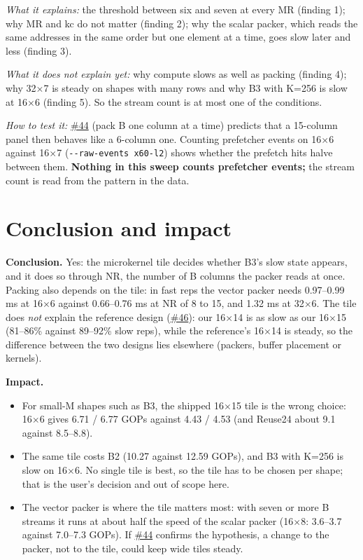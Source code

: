 \documentclass[10pt,a4paper]{article}
\newcommand{\iss}[1]{\href{https://github.com/JieGH/RVV_code_gen_via_MLIR_xDSL/issues/#1}{\##1}}
\begin{document}
\emph{What it explains:} the threshold between six and seven at every MR (finding 1); why MR and kc do not matter
(finding 2); why the scalar packer, which reads the same addresses in the same order but one element at a time, goes
slow later and less (finding 3).

\emph{What it does not explain yet:} why compute slows as well as packing (finding 4); why 32$\times$7 is steady on shapes with
many rows and why B3 with K=256 is slow at 16$\times$6 (finding 5). So the stream count is at most one of the conditions.

\emph{How to test it:} \iss{44} (pack B one column at a time) predicts that a 15-column panel then behaves like a
6-column one. Counting prefetcher events on 16$\times$6 against 16$\times$7 (\texttt{-{}-raw-events x60-l2}) shows whether
the prefetch hits halve between them. \textbf{Nothing in this sweep counts prefetcher events;} the stream count is read from the
pattern in the data.

\section{Conclusion and impact}
\textbf{Conclusion.} Yes: the microkernel tile decides whether B3's slow state appears, and it does so through NR, the
number of B columns the packer reads at once. Packing also depends on the tile: in fast reps the vector packer needs
0.97--0.99 ms at 16$\times$6 against 0.66--0.76 ms at NR of 8 to 15, and 1.32 ms at 32$\times$6. The tile does \emph{not} explain
the reference design (\iss{46}): our 16$\times$14 is as slow as our 16$\times$15 (81--86\% against 89--92\% slow reps),
while the reference's 16$\times$14 is steady, so the difference between the two designs lies elsewhere (packers, buffer
placement or kernels).

\textbf{Impact.}
\begin{itemize}
  \item For small-M shapes such as B3, the shipped 16$\times$15 tile is the wrong choice: 16$\times$6 gives
  6.71 / 6.77 GOPs against 4.43 / 4.53 (and Reuse24 about 9.1 against 8.5--8.8).
  \item The same tile costs B2 (10.27 against 12.59 GOPs), and B3 with K=256 is slow on 16$\times$6. No single tile is best,
  so the tile has to be chosen per shape; that is the user's decision and out of scope here.
  \item The vector packer is where the tile matters most: with seven or more B streams it runs at about half the speed of the scalar
  packer (16$\times$8: 3.6--3.7 against 7.0--7.3 GOPs). If \iss{44} confirms the hypothesis, a change to the packer, not to the tile,
  could keep wide tiles steady.
\end{itemize}
\end{document}
